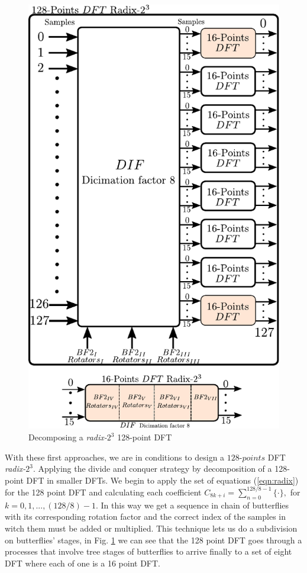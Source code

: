 \documentclass[journal,comsoc]{IEEEtran}
\begin{document}
\begin{figure}[t!]
	\centering
	\includegraphics[width=0.8\linewidth]{Diagramas/miSeccionFiguras/BloquesDft.pdf}
	\caption{Decomposing a \textit{radix-}$2^3$ 128-point DFT	}
	\label{fig:bloquesdft}
\end{figure}
With these first approaches, we are in conditions to design a $128$-$points$ DFT \textit{radix-}$2^3$. Applying the divide and conquer strategy by decomposition of a 128-point DFT in smaller DFTs. We begin to apply the set of equations (\ref{eqn:radix}) for the 128 point DFT and calculating each coefficient $C_{8k+i} = \sum_{n=0}^{128/8-1} \{ \cdot \}, $ for $k=0,1,...,(128/8)-1$. In this way we get a sequence in chain of butterflies with its corresponding rotation factor and the correct index of the samples in witch them must be added or multiplied. This technique lets us do a subdivision on butterflies' stages, in Fig. \ref{fig:bloquesdft} we can see that the 128 point DFT goes through a processes that involve tree stages of butterflies to arrive finally to a set of eight DFT where each of one is a 16 point DFT.
\end{document}
